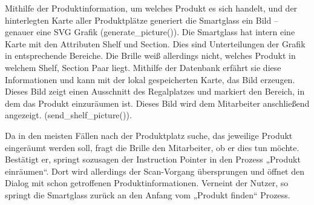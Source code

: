 Mithilfe der Produktinformation, um welches Produkt es sich handelt, und der hinterlegten Karte aller Produktplätze generiert die Smartglass ein Bild – genauer eine SVG Grafik (generate\_picture()). Die Smartglass hat intern eine Karte mit den Attributen Shelf und Section. Dies sind Unterteilungen der Grafik in entsprechende Bereiche. Die Brille weiß allerdings nicht, welches Produkt in welchem Shelf, Section Paar liegt. Mithilfe der Datenbank erfährt sie diese Informationen und kann mit der lokal gespeicherten Karte, das Bild erzeugen. Dieses Bild zeigt einen Ausschnitt des Regalplatzes und markiert den Bereich, in dem das Produkt einzuräumen ist. Dieses Bild wird dem Mitarbeiter anschließend angezeigt. (send\_shelf\_picture()).

Da in den meisten Fällen nach der Produktplatz suche, das jeweilige Produkt eingeräumt werden soll, fragt die Brille den Mitarbeiter, ob er dies tun möchte.
Bestätigt er, springt sozusagen der Instruction Pointer in den Prozess „Produkt einräumen“. Dort wird allerdings der Scan-Vorgang übersprungen und öffnet den Dialog mit schon getroffenen Produktinformationen. 
Verneint der Nutzer, so springt die Smartglass zurück an den Anfang vom „Produkt finden“ Prozess. 

